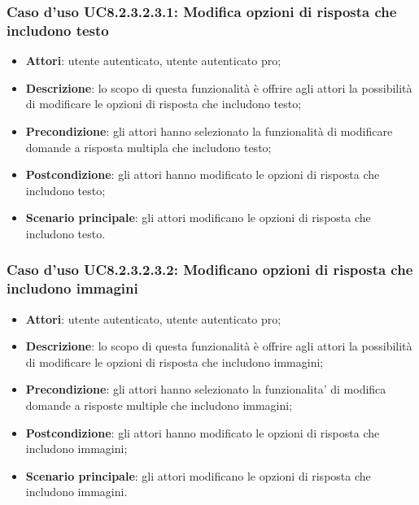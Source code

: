 \subsubsection{Caso d'uso UC8.2.3.2.3.1: Modifica opzioni di risposta che includono testo}
	\begin{itemize}
		\item
			\textbf{Attori}: utente autenticato, utente autenticato pro;
		\item		
			\textbf{Descrizione}: lo scopo di questa funzionalità è offrire agli attori la possibilità di modificare le opzioni di risposta che includono testo;
		\item
			\textbf{Precondizione}: gli attori hanno selezionato la funzionalità di modificare domande a risposta multipla che includono testo; 
		\item
			\textbf{Postcondizione}: gli attori hanno modificato le opzioni di risposta che includono testo;
		\item
			\textbf{Scenario principale}: gli attori modificano le opzioni di risposta che includono testo. 			
	\end{itemize}	
	
\subsubsection{Caso d'uso UC8.2.3.2.3.2: Modificano opzioni di risposta che includono immagini}
	\begin{itemize}
		\item
			\textbf{Attori}: utente autenticato, utente autenticato pro;
		\item		
			\textbf{Descrizione}: lo scopo di questa funzionalità è offrire agli attori la possibilità di modificare le opzioni di risposta che includono immagini;
		\item
			\textbf{Precondizione}: gli attori hanno selezionato la funzionalita' di modifica domande a risposte multiple che includono immagini; 
		\item
			\textbf{Postcondizione}: gli attori hanno modificato le opzioni di risposta che includono immagini;
		\item
			\textbf{Scenario principale}: gli attori modificano le opzioni di risposta che includono immagini. 			
	\end{itemize}
	
